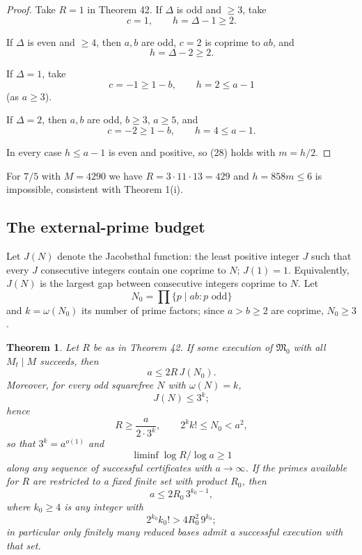 \documentclass[11pt,reqno]{amsart}
\newtheorem{theorem}{Theorem}
\theoremstyle{definition}
\theoremstyle{remark}
\begin{document}
\begin{proof}\leavevmode\label{proof:43}
Take \(R=1\) in Theorem 42. If \(\Delta\) is odd and
\(\ge3\), take
\[
c=1,\qquad h=\Delta-1\ge2.
\]

If \(\Delta\) is even and
\(\ge4\), then \(a,b\) are odd, \(c=2\) is coprime to \(ab\), and
\[
h=\Delta-2\ge2.
\]

If \(\Delta=1\), take
\[
c=-1\ge1-b,\qquad h=2\le a-1
\]
(as \(a\ge3\)).

If \(\Delta=2\), then \(a,b\) are odd, \(b\ge3\),
\(a\ge5\), and
\[
c=-2\ge1-b,\qquad h=4\le a-1.
\]

In every case
\(h\le a-1\) is even and positive, so (28) holds with \(m=h/2\). \qedhere
\end{proof}

For \(7/5\) with \(M=4290\) we have \(R=3\cdot11\cdot13=429\) and
\(h=858m\le6\) is impossible, consistent with Theorem 1(i).

\subsection{The external-prime budget}\label{sec:8.4}

Let \(J(N)\) denote the Jacobsthal function: the least positive integer
\(J\) such that every \(J\) consecutive integers contain one coprime to
\(N\); \(J(1)=1\). Equivalently, \(J(N)\) is the largest gap between
consecutive integers coprime to \(N\). Let
\[
N_0=\prod\{p\mid ab:p\text{ odd}\}
\]
and \(k=\omega(N_0)\) its number
of prime factors; since \(a>b\ge2\) are coprime, \(N_0\ge3\).

\begin{samepage}
\begin{theorem}\leavevmode\label{thm:44}
Let \(R\) be as in Theorem 42. If some execution of
\(\mathfrak M_0\) with all \(M_t\mid M\) succeeds, then
\[
a\le2R\,J(N_0).
\tag{29}\label{eq:29}
\]
Moreover, for every odd squarefree \(N\) with \(\omega(N)=k\),
\[
J(N)\le3^k;
\]
hence
\[
R\ge\frac{a}{2\cdot3^{k}},\qquad 2^kk!\le N_0<a^2,
\tag{30}\label{eq:30}
\]
so that \(3^k=a^{o(1)}\) and
\[
\liminf\log R/\log a\ge1
\]
along any
sequence of successful certificates with \(a\to\infty\). If the primes
available for \(R\) are restricted to a fixed finite set with product
\(R_0\), then
\[
a\le2R_0\,3^{k_0-1},
\]
where \(k_0\ge4\) is any integer
with
\[
2^{k_0}k_0!>4R_0^2\,9^{k_0};
\]
in particular only finitely many
reduced bases admit a successful execution with that set.
\label{thm-end:44}
\end{theorem}
\end{samepage}
\end{document}
